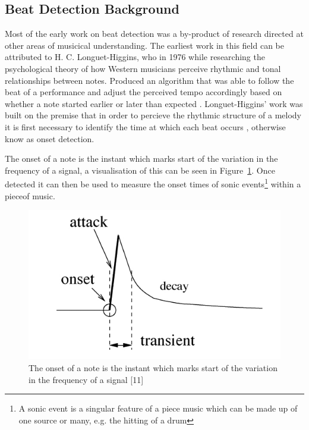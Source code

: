 \documentclass[a4paper, 11pt]{article}
\begin{document}
\subsection{Beat Detection Background}
Most of the early work on beat detection was a by-product of research directed at other areas of musicical understanding. The earliest work in this field can be attributed to H. C. Longuet-Higgins, who in 1976 while researching the psychological theory of how Western musicians perceive rhythmic and tonal relationships between notes. Produced an algorithm that was able to follow the beat of a performance and adjust the perceived tempo accordingly based on whether a note started earlier or later than expected \cite{allen-danneburg}. Longuet-Higgins' work was built on the premise that in order to percieve the rhythmic structure of a melody it is first necessary to identify the time at which each beat occurs \cite{longeut1}, otherwise know as onset detection.\par 

The onset of a note is the instant which marks start of the variation in the frequency of a signal, a visualisation of this can be seen in Figure~\ref{fig: Onset}. Once detected it can then be used to measure the onset times of sonic events\footnote{A sonic event is a singular feature of a piece music which can be made up of one source or many\cite{sonic}, e.g. the hitting of a drum} within a pieceof music\cite{mirex-onset}.

\begin{figure}[h]
	\centering
	\includegraphics[scale=0.40]{Onset}
	\caption{The onset of a note is the instant which marks start of the variation in the frequency of a signal [11]}
	\label{fig: Onset}
\end{figure}
\end{document}
